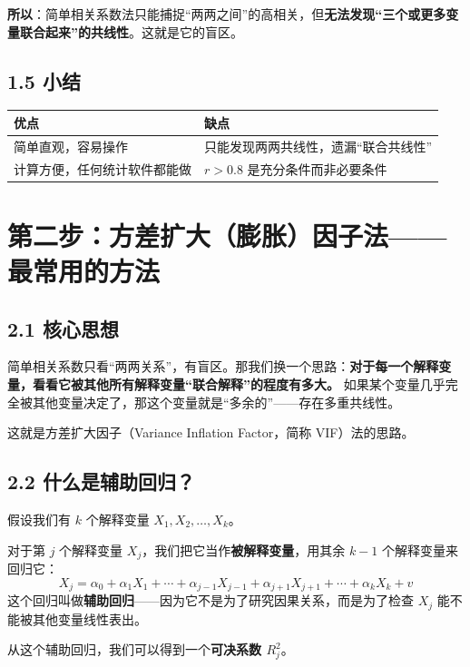 \documentclass[12pt,a4paper]{ctexart}
\begin{document}
\textbf{所以}：简单相关系数法只能捕捉“两两之间”的高相关，但\textbf{无法发现“三个或更多变量联合起来”的共线性}。这就是它的盲区。

\subsection*{1.5 小结}

\begin{center}
\begin{tabular}{p{5cm} p{5cm}}
\toprule
\textbf{优点} & \textbf{缺点} \\
\midrule
简单直观，容易操作 & 只能发现两两共线性，遗漏“联合共线性” \\
\addlinespace
计算方便，任何统计软件都能做 & $r > 0.8$ 是充分条件而非必要条件 \\
\bottomrule
\end{tabular}
\end{center}

\section*{第二步：方差扩大（膨胀）因子法——最常用的方法}

\subsection*{2.1 核心思想}

简单相关系数只看“两两关系”，有盲区。那我们换一个思路：\textbf{对于每一个解释变量，看看它被其他所有解释变量“联合解释”的程度有多大。} 如果某个变量几乎完全被其他变量决定了，那这个变量就是“多余的”——存在多重共线性。

这就是方差扩大因子（Variance Inflation Factor，简称 VIF）法的思路。

\subsection*{2.2 什么是辅助回归？}

假设我们有 $k$ 个解释变量 $X_1, X_2, \ldots, X_k$。

对于第 $j$ 个解释变量 $X_j$，我们把它当作\textbf{被解释变量}，用其余 $k-1$ 个解释变量来回归它：
\[
X_j = \alpha_0 + \alpha_1 X_1 + \cdots + \alpha_{j-1} X_{j-1} + \alpha_{j+1} X_{j+1} + \cdots + \alpha_k X_k + v
\]
这个回归叫做\textbf{辅助回归}——因为它不是为了研究因果关系，而是为了检查 $X_j$ 能不能被其他变量线性表出。

从这个辅助回归，我们可以得到一个\textbf{可决系数 $R_j^2$}。
\end{document}

